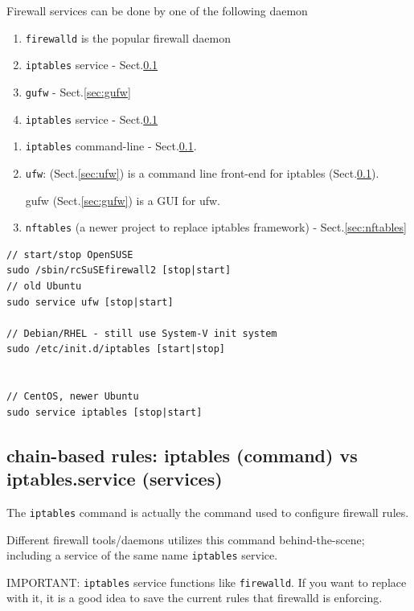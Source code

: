 Firewall services can be done by one of the following daemon
\begin{enumerate}
  \item  \verb!firewalld! is the popular firewall daemon 
  
  \item \verb!iptables! service - Sect.\ref{sec:iptables}
  
  \item \verb!gufw! - Sect.\ref{sec:gufw}
  
  \item \verb!iptables! service - Sect.\ref{sec:iptables}
\end{enumerate}

\begin{enumerate}
  \item  \verb!iptables! command-line - Sect.\ref{sec:iptables}.

  \item \verb!ufw!: (Sect.\ref{sec:ufw}) is a command line front-end
  for iptables (Sect.\ref{sec:iptables}).

gufw (Sect.\ref{sec:gufw}) is a GUI for ufw.

   \item \verb!nftables! (a newer project to replace iptables framework) -
   Sect.\ref{sec:nftables}   
\end{enumerate}


\begin{verbatim}
// start/stop OpenSUSE
sudo /sbin/rcSuSEfirewall2 [stop|start]
// old Ubuntu
sudo service ufw [stop|start]

// Debian/RHEL - still use System-V init system
sudo /etc/init.d/iptables [start|stop]


// CentOS, newer Ubuntu
sudo service iptables [stop|start]
\end{verbatim}

\subsection{chain-based rules: iptables (command) vs iptables.service
(services)}
\label{sec:iptables}
\label{sec:iptables-service}

The \verb!iptables! command is actually the command used to configure firewall
rules.

Different firewall tools/daemons utilizes this command behind-the-scene;
including a service of the same name \verb!iptables! service.

IMPORTANT: \verb!iptables! service functions like \verb!firewalld!. If you want
to replace with it, it is a good idea to save the current rules that firewalld
is enforcing.

